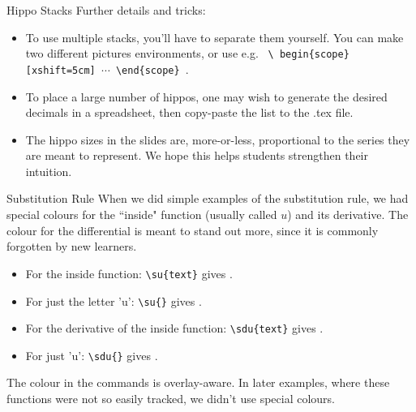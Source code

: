 \documentclass[10pt]{beamer}
\begin{document}
\begin{frame}{Hippo Stacks}
Further details and tricks:
\begin{itemize}
\item To use multiple stacks, you'll have to separate them yourself. You can make two different pictures environments, or use e.g. \texttt{
\textbackslash
 begin\{scope\}[xshift=5cm]
  $\cdots$ 
  \textbackslash end\{scope\}
}.\vfill


\item To place a large number of hippos, one may wish to generate the desired decimals in a spreadsheet, then copy-paste the list to the .tex file.\vfill

\item The hippo sizes in the slides are, more-or-less,  proportional to the series they are meant to represent. We hope this helps students strengthen their intuition.
\end{itemize}
\end{frame}
\begin{frame}{Substitution Rule}
When we did simple examples of the substitution rule, we had special colours for the ``inside" function (usually called $u$) and its derivative. The colour for the differential is meant to stand out more, since it is commonly forgotten by new learners.
\vfill
\begin{itemize}
\item For the inside function: \texttt{\textbackslash su\{text\}} gives  .
\item For just the letter 'u':  \texttt{\textbackslash su\{\}} gives  \su{}.
\item For the derivative of the inside function: \texttt{\textbackslash sdu\{text\}} gives  .
\item For just  '\dee u':  \texttt{\textbackslash sdu\{\}} gives  \sdu{}.
\end{itemize}
The colour in the commands is overlay-aware.
\vfill
In later examples, where these functions were not so easily tracked, we didn't use special colours.
\end{frame}
\LastPage
\end{document}
